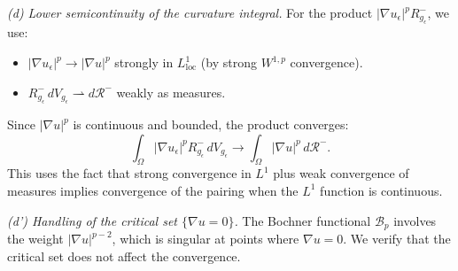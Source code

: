 \textit{(d) Lower semicontinuity of the curvature integral.} For the product $|\nabla u_\epsilon|^p R_{g_\epsilon}^-$, we use:
\begin{itemize}
    \item $|\nabla u_\epsilon|^p \to |\nabla u|^p$ strongly in $L^1_{\mathrm{loc}}$ (by strong $W^{1,p}$ convergence).
    \item $R_{g_\epsilon}^- \, dV_{g_\epsilon} \rightharpoonup d\mathcal{R}^-$ weakly as measures.
\end{itemize}
Since $|\nabla u|^p$ is continuous and bounded, the product converges:
\begin{equation}
    \int_\Omega |\nabla u_\epsilon|^p R_{g_\epsilon}^- \, dV_{g_\epsilon} \to \int_\Omega |\nabla u|^p \, d\mathcal{R}^-.
\end{equation}
This uses the fact that strong convergence in $L^1$ plus weak convergence of measures implies convergence of the pairing when the $L^1$ function is continuous.

\textit{(d') Handling of the critical set $\{\nabla u = 0\}$.} The Bochner functional $\mathcal{B}_p$ involves the weight $|\nabla u|^{p-2}$, which is singular at points where $\nabla u = 0$. We verify that the critical set does not affect the convergence.

